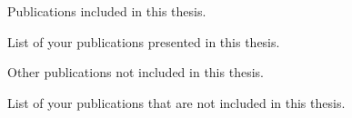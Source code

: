 \Large
Publications included in this thesis.
\normalsize

List of your publications presented in this thesis. 

\vspace{1cm}
\Large
Other publications not included in this thesis.
\normalsize

List of your publications that are not included in this thesis. 